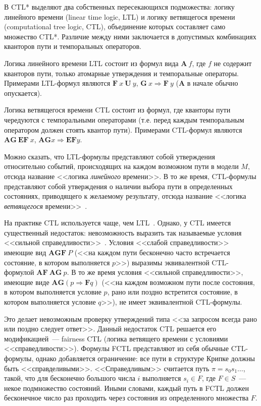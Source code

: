 \documentclass[a4paper,notitlepage,14pt]{article}
\begin{document}
В CTL* выделяют два собственных пересекающихся подможества: логику линейного времени
(linear time logic, LTL) и логику ветвящегося времени (computational tree logic, CTL),
объединение которых составляет само множество CTL*. Различие между ними заключается в
допустимых комбинациях кванторов пути и темпоральных операторов.

Логика линейного времени LTL состоит из формул вида $\mathbf{A}~f$, где $f$ не содержит
кванторов пути, только атомарные утверждения и темпоральные операторы. Примерами
LTL-формул являются $\mathbf{F}~x~\mathbf{U}~y$, $\mathbf{G}~x \Rightarrow \mathbf{F}~y$
($\mathbf{A}$ в начале обычно опускается).

Логика ветвящегося времени CTL состоит из формул, где кванторы пути чередуются с
темпоральными операторами (т.е. перед каждым темпоральным оператором должен стоять квантор
пути). Примерами CTL-формул являются $\mathbf{AG}~\mathbf{EF}~x$, $\mathbf{AG} x
\Rightarrow \mathbf{EF} y$.

Можно сказать, что LTL-формулы представляют собой утверждения относительно событий,
происходящих на каждом возможном пути в модели $M$, отсюда название <<логика
\emph{линейного} времени>>. В то же время, CTL-формулы представляют собой утверждения о
наличии выбора пути в определенных состояниях, приводящего к желаемому результату, отсюда
название <<логика \emph{ветвящегося} времени>>~\cite{Clarke}.

На практике CTL используется чаще, чем LTL~\cite{Stirling96modaland}. Однако, у CTL
имеется существенный недостаток: невозможность выразить так называемые условия <<сильной
справедливости>>~\cite{Katoen,DBLP:conf/spin/FaragoS09}. Условия <<слабой справедливости>>
имеющие вид $\mathbf{AGF}~P$ (<<на каждом пути бесконечно часто встречается состояние, в
котором выполняется $p$>>) выразимы эквивалентной CTL-формулой $\mathbf{AF~AG}~p$. В то же
время условия <<сильной справедливости>>, имеющие виде $\mathbf{AG} (p \Rightarrow
\mathbf{F} q)$ (<<на каждом возможном пути после состояния, в котором выполняется условие
$p$, рано или поздно встретится состояние, в котором выполняется условие $q$>>), не имеет
эквивалентной CTL-формулы.

Это делает невозможным проверку утверждений типа <<за запросом всегда рано или поздно
следует ответ>>. Данный недостаток CTL решается его модификацией~--- fairness CTL (логика
ветвящего времени с условиями <<справедливости>>). Формулы FCTL представляют из себя
обычные CTL-формулы, однако добавляется ограничение: все пути в структуре Крипке должны
быть <<справделивыми>>. <<Справедливым>> считается путь $\pi = s_0s_1\ldots$, такой, что
для бесконечно большого числа $i$ выполняется $s_i \in F$, где $F \in S$~--- некое
подмножество состояний. Иными словами, каждый путь в FCTL должен бесконечное число раз
проходить через состояния из определенного множества $F$.
\end{document}

